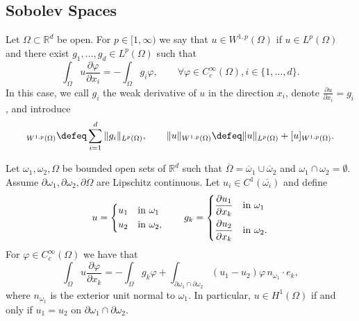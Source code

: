 \subsection{Sobolev Spaces}

\begin{definition}
    Let $\Omega \subset \mathbb R^d$ be open. For $p \in [1,\infty)$ we say that $u \in W^{1,p} (\Omega)$ if $u \in L^p (\Omega)$ and there exist $g_1, \dots, g_d \in L^p(\Omega)$ such that
    \begin{equation*}
        \int_\Omega u \frac{\partial \varphi}{\partial x_i} = - \int_\Omega g_i \varphi , \qquad \forall \varphi \in C_c^\infty(\Omega), i \in \{1, \dots, d\}.
    \end{equation*}
    In this case, we call $g_i$ the weak derivative of $u$ in the direction $x_i$, denote $\frac{\partial u}{\partial x_i} = g_i$, and introduce
    \begin{equation*}
        [u]_{W^{1,p}(\Omega)} \defeq \sum_{i=1}^d \| g_i \|_{L^p (\Omega)}, \qquad
        \|u\|_{W^{1,p}(\Omega)} \defeq \|u\|_{L^p (\Omega)} + [u]_{W^{1,p} (\Omega)}.
    \end{equation*}
\end{definition}

\begin{strongtheorem}
    \label{thm:H1 glueing}
    Let $\omega_1, \omega_2, \Omega$ be bounded open sets of $\mathbb R^d$ such that $\overline \Omega = \overline \omega_1 \cup \overline\omega_2$ and $\omega_1 \cap \omega_2 = \emptyset$.
    Assume $\partial \omega_1, \partial \omega_2, \partial \Omega$ are Lipschitz continuous. Let $u_i \in C^1 (\overline {\omega_i})$ and define
    \begin{equation*}
        u = \begin{dcases}
            u_1 & \text{in } \omega_1  \\
            u_2 & \text{in } \omega_2,
        \end{dcases}
        \qquad
        g_k =
        \begin{dcases}
            \frac{\partial u_1}{\partial x_k} & \text{in } \omega_1  \\
            \frac{\partial u_2}{\partial x_k} & \text{in } \omega_2.
        \end{dcases}
    \end{equation*}
    For $\varphi \in C_c^\infty(\Omega)$ we have that
    \begin{equation*}
        \int_\Omega u \frac{\partial \varphi}{\partial x_k} = - \int_\Omega g_k \varphi + \int_{\partial \omega_1 \cap \partial \omega_2} (u_1 - u_2) \varphi \, n_{\omega_1} \cdot e_k ,
    \end{equation*}
    where $n_{\omega_1}$ is the exterior unit normal to $\omega_1$.
    In particular, $u \in H^1 (\Omega)$ if and only if $u_1 = u_2$ on $\partial \omega_1 \cap \partial \omega_2$.
\end{strongtheorem}

